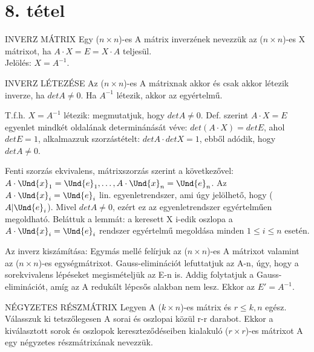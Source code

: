\section{8. tétel}

\begin{definicio}{INVERZ MÁTRIX}
Egy ($n \times n$)-es A mátrix inverzének nevezzük az ($n \times n$)-es X mátrixot, ha $A \cdot X = E = X \cdot A$ teljesül.\\
Jelölés: $X = A^{-1}$.
\end{definicio}

\begin{tetel}{INVERZ LÉTEZÉSE}
Az ($n \times n$)-es A mátrixnak akkor és csak akkor létezik inverze, ha $detA \neq 0$. Ha $A^{-1}$ létezik, akkor az egyértelmű.
\end{tetel}

\begin{bizonyitas}{}
T.f.h. $X = A^{-1}$ létezik: megmutatjuk, hogy $detA \neq 0$. Def. szerint $A \cdot X = E$ egyenlet mindkét oldalának determinánását véve: $det(A \cdot X) = detE$, ahol $detE = 1$, alkalmazzuk szorzástételt: $detA \cdot detX = 1$, ebből adódik, hogy $detA \neq 0$.
\end{bizonyitas}


\begin{bizonyitas}{}
Fenti szorzás ekvivalens, mátrixszorzás szerint a következővel: $A \cdot \Und{x}_1 = \Und{e}_1, \ldots, A \cdot \Und{x}_n = \Und{e}_n$. Az $A\cdot \Und{x}_i = \Und{e}_i$ lin. egyenletrendszer, ami úgy jelölhető, hogy ($A|\Und{e}_i$). Mivel $detA \neq 0$, ezért ez az egyenletrendszer egyértelműen megoldható. Beláttuk a lemmát: a keresett X i-edik oszlopa a $A\cdot \Und{x}_i = \Und{e}_i$ rendszer egyértelmű megoldása minden $1 \leq i \leq n$ esetén.
\end{bizonyitas}

Az inverz kiszámítása: Egymás mellé felírjuk az ($n \times n$)-es A mátrixot valamint az ($n \times n$)-es egységmátrixot. Gauss-eliminációt lefuttatjuk az A-n, úgy, hogy a sorekvivalens lépéseket megismételjük az E-n is. Addig folytatjuk a Gauss-eliminációt, amíg az A redukált lépcsős alakban nem lesz. Ekkor az $E' = A^{-1}$.

\begin{definicio}{NÉGYZETES RÉSZMÁTRIX}
Legyen A ($k \times n$)-es mátrix és $r \leq k,n$ egész. Válasszuk ki tetszőlegesen A sorai és oszlopai közül r-r darabot. Ekkor a kiválasztott sorok és oszlopok kereszteződéseiben kialakuló ($r \times r$)-es mátrixot A egy négyzetes részmátrixának nevezzük.
\end{definicio}

